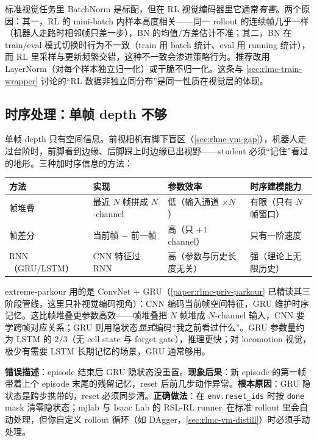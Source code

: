 \begin{insight}\label{ins:rlmc-vm-nobn}
标准视觉任务里 BatchNorm 是标配，但在 RL 视觉编码器里它通常\emph{有害}。两个原因：其一，RL 的 mini-batch 内样本高度相关——同一 rollout 的连续帧几乎一样（机器人走路时相邻帧只差一步），BN 的均值/方差估计不准；其二，BN 在 train/eval 模式切换时行为不一致（train 用 batch 统计、eval 用 running 统计），而 RL 里采样与更新频繁交错，这种不一致会渗进策略行为。推荐改用 LayerNorm（对每个样本独立归一化）或干脆不归一化。这条与 \cref{sec:rlmc-train-wrapper} 讨论的“RL 数据非独立同分布”是同一性质在视觉层的体现。
\end{insight}

\subsection{时序处理：单帧 depth 不够}
\label{sec:rlmc-vm-temporal}

单帧 depth 只有空间信息。前视相机有脚下盲区（\cref{sec:rlmc-vm-gap}），机器人走过台阶时，前脚看到边缘、后脚踩上时边缘已出视野——student 必须“记住”看过的地形。三种加时序信息的方法：

\begin{center}
\small
\begin{tabular}{@{}llll@{}}
\toprule
方法 & 实现 & 参数效率 & 时序建模能力 \\
\midrule
帧堆叠 & 最近 $N$ 帧拼成 $N$-channel & 低（输入通道 $\times N$） & 有限（只有 $N$ 帧窗口） \\
帧差分 & 当前帧 $-$ 前一帧 & 高（只 $+1$ channel） & 只有一阶速度 \\
RNN（GRU/LSTM） & CNN 特征过 RNN & 高（参数与历史长度无关） & 强（理论上无限历史） \\
\bottomrule
\end{tabular}
\end{center}

extreme-parkour 用的是 ConvNet + GRU（\cref{paper:rlmc-priv-parkour} 已精读其三阶段管线，这里只补视觉编码视角）：CNN 编码当前帧空间特征，GRU 维护时序记忆。这比帧堆叠更参数高效——帧堆叠把 $N$ 帧堆成 $N$-channel 输入，CNN 要学跨帧对应关系；GRU 则用隐状态\emph{显式}编码“我之前看过什么”。GRU 参数量约为 LSTM 的 $2/3$（无 cell state 与 forget gate），推理更快；对 locomotion 视觉，极少有需要 LSTM 长期记忆的场景，GRU 通常够用。

\begin{pitfall}
\textbf{错误描述}：episode 结束后 GRU 隐状态没重置。\textbf{现象后果}：新 episode 的第一帧带着上个 episode 末尾的残留记忆，reset 后前几步动作异常。\textbf{根本原因}：GRU 隐状态是跨步携带的，reset 必须同步清。\textbf{正确做法}：在 \verb|env.reset_ids| 时按 \verb|done| mask 清零隐状态；mjlab 与 Isaac Lab 的 RSL-RL runner\,\cite{schwarke2025rslrl} 在标准 rollout 里会自动处理，但你自定义 rollout 循环（如 DAgger，\cref{sec:rlmc-vm-distill}）时必须手动处理。
\end{pitfall}

